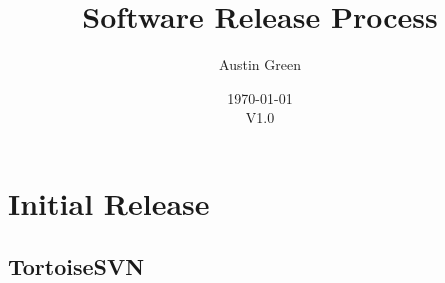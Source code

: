 \documentclass[10pt]{article}
\title{Software Release Process}
\author{Austin Green}
\date{\today\\V1.0}
\begin{document}
    \begin{titlepage}
    \maketitle
    \thispagestyle{empty}
    \end{titlepage}

	\tableofcontents
	\newpage

    \section{Initial Release}
        \subsection{TortoiseSVN}
\end{document}
